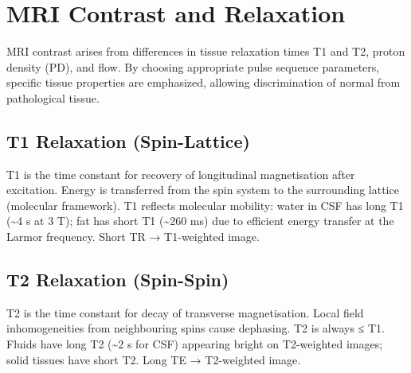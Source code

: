 \section{MRI Contrast and Relaxation}\label{sec:wiki_mri_contrast}



MRI contrast arises from differences in tissue relaxation times T1 and T2, proton density (PD), and flow. By choosing appropriate pulse sequence parameters, specific tissue properties are emphasized, allowing discrimination of normal from pathological tissue.

				

\subsection{T1 Relaxation (Spin-Lattice)}

				


				

T1 is the time constant for recovery of longitudinal magnetisation after excitation. Energy is transferred from the spin system to the surrounding lattice (molecular framework). T1 reflects molecular mobility: water in CSF has long T1 (\textasciitilde{}4 s at 3 T); fat has short T1 (\textasciitilde{}260 ms) due to efficient energy transfer at the Larmor frequency. Short TR → T1-weighted image.


				

\subsection{T2 Relaxation (Spin-Spin)}

				

T2 is the time constant for decay of transverse magnetisation. Local field inhomogeneities from neighbouring spins cause dephasing. T2 is always ≤ T1. Fluids have long T2 (\textasciitilde{}2 s for CSF) appearing bright on T2-weighted images; solid tissues have short T2. Long TE → T2-weighted image.

				

